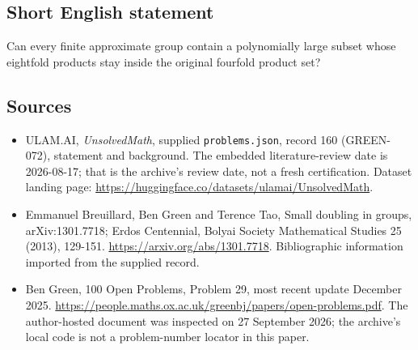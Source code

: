 \documentclass[11pt,a4paper]{article}
\begin{document}
\subsection{Short English statement}

Can every finite approximate group contain a polynomially large subset whose eightfold products stay inside the original fourfold product set?

\subsection{Sources}

{\small

\begin{itemize}

\item[\hypertarget{source:160:1}{S1}] ULAM.AI, \emph{UnsolvedMath}, supplied \texttt{problems.json}, record 160 (GREEN-072), statement and background. The embedded literature-review date is 2026-08-17; that is the archive’s review date, not a fresh certification. Dataset landing page: \url{https://huggingface.co/datasets/ulamai/UnsolvedMath}.

\item[\hypertarget{source:160:2}{S2}] Emmanuel Breuillard, Ben Green and Terence Tao, Small doubling in groups, arXiv:1301.7718; Erdos Centennial, Bolyai Society Mathematical Studies 25 (2013), 129-151. \url{https://arxiv.org/abs/1301.7718}. Bibliographic information imported from the supplied record.

\item[\hypertarget{source:160:3}{S3}] Ben Green, 100 Open Problems, Problem 29, most recent update December 2025. \url{https://people.maths.ox.ac.uk/greenbj/papers/open-problems.pdf}. The author-hosted document was inspected on 27 September 2026; the archive’s local code is not a problem-number locator in this paper.

\end{itemize}

}

\label{end:160}
\end{document}
